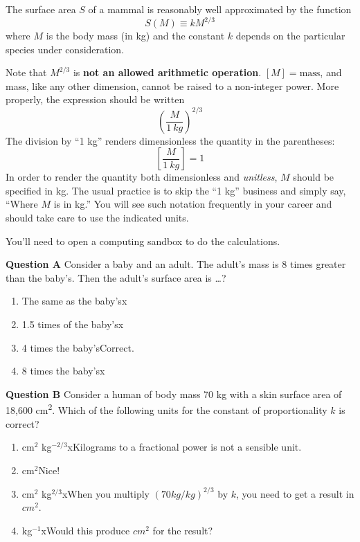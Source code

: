 \documentclass[
  letterpaper,
  DIV=11,
  numbers=noendperiod,
  oneside]{article}
\providecommand{\tightlist}{%
  \setlength{\itemsep}{0pt}\setlength{\parskip}{0pt}}\usepackage{longtable,booktabs,array}
\begin{document}
\begin{multicols}{2}
The surface area \(S\) of a mammal is reasonably well approximated by
the function \[S(M) \equiv k M^{2/3}\] where \(M\) is the body mass (in
kg) and the constant \(k\) depends on the particular species under
consideration.

Note that \(M^{2/3}\) is \textbf{not an allowed arithmetic operation}.
\([M] = \text{mass}\), and mass, like any other dimension, cannot be
raised to a non-integer power. More properly, the expression should be
written \[\left(\frac{M}{1\  kg}\right)^{2/3}\] The division by ``1 kg''
renders dimensionless the quantity in the parentheses:
\[\left[\frac{M}{1\  kg}\right] = 1\] In order to render the quantity
both dimensionless and \emph{unitless}, \(M\) should be specified in kg.
The usual practice is to skip the ``1 kg'' business and simply say,
``Where \(M\) is in kg.'' You will see such notation frequently in your
career and should take care to use the indicated units.

You'll need to open a computing sandbox to do the calculations.

\textbf{Question A} Consider a baby and an adult. The adult's mass is
\(8\) times greater than the baby's. Then the adult's surface area is
\ldots?

\begin{enumerate}
\def\labelenumi{\roman{enumi}.}
\tightlist
\item
  {The same as the baby's{x}}\\
\item
  {1.5 times of the baby's{x}}\\
\item
  {4 times the baby's{Correct.~}}\\
\item
  {8 times the baby's{x}}
\end{enumerate}

\textbf{Question B} Consider a human of body mass 70 kg with a skin
surface area of 18,600 cm\textsuperscript{2}. Which of the following
units for the constant of proportionality \(k\) is correct?

\begin{enumerate}
\def\labelenumi{\roman{enumi}.}
\tightlist
\item
  {cm\(^2\) kg\(^{-2/3}\){xKilograms to a fractional power is not a
  sensible unit.}}\\
\item
  {cm\(^2\){Nice!~}}\\
\item
  {cm\(^2\) kg\(^{2/3}\){xWhen you multiply \((70 kg/kg)^{2/3}\) by
  \(k\), you need to get a result in \(cm^2\).}}\\
\item
  {kg\(^{-1}\){xWould this produce \(cm^2\) for the result?}}
\end{enumerate}


\end{multicols}
\end{document}
